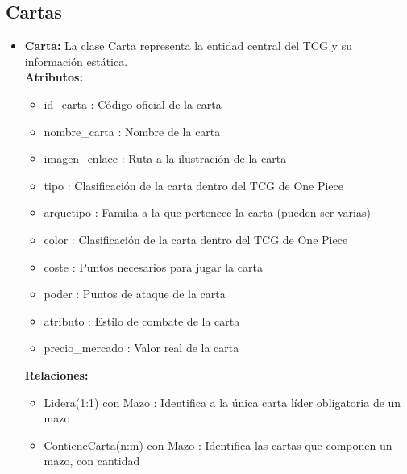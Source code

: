 \documentclass[10pt]{article}
\begin{document}
        \subsection{Cartas}
        \begin{itemize}
            \item \textbf{Carta:} La clase Carta representa la entidad central del TCG y su información estática.\\
            \textbf{Atributos:}
            \begin{itemize}
                \item id\_carta : Código oficial de la carta
                \item nombre\_carta : Nombre de la carta
                \item imagen\_enlace : Ruta a la ilustración de la carta
                \item tipo : Clasificación de la carta dentro del TCG de One Piece
                \item arquetipo : Familia a la que pertenece la carta (pueden ser varias)
                \item color : Clasificación de la carta dentro del TCG de One Piece
                \item coste : Puntos necesarios para jugar la carta
                \item poder : Puntos de ataque de la carta
                \item atributo : Estilo de combate de la carta
                \item precio\_mercado : Valor real de la carta
            \end{itemize}
            \textbf{Relaciones:}
            \begin{itemize}
                \item Lidera(1:1) con Mazo : Identifica a la única carta líder obligatoria de un mazo
                \item ContieneCarta(n:m) con Mazo : Identifica las cartas que componen un mazo, con cantidad
            \end{itemize}
        \end{itemize}
        
\end{document}
